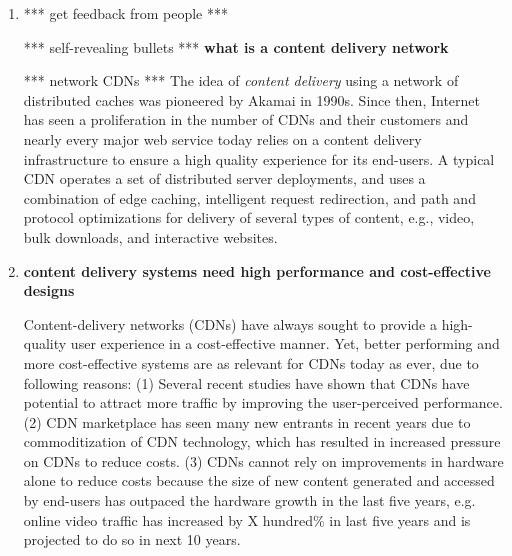 \begin{enumerate}
\item

*** get feedback from people ***

*** self-revealing bullets ***
\textbf{what is a content delivery network}


*** network CDNs ***
The idea of \emph{content delivery} using a network of distributed caches was pioneered by Akamai in 1990s. Since then, Internet has seen a proliferation in the number of CDNs and their customers and nearly every major web service today relies on a content delivery infrastructure to ensure a high quality experience for its end-users. A typical CDN  operates a set of distributed server deployments, and uses a combination of edge caching, intelligent request redirection, and path and protocol optimizations for delivery of several types of content, e.g., video, bulk downloads, and interactive websites. 


\item
\textbf{content delivery systems need  high performance and cost-effective designs}

Content-delivery networks (CDNs) have always sought to provide a high-quality user experience in a cost-effective manner. Yet, better performing and more cost-effective systems are as relevant for CDNs today as ever, due to following reasons:
(1) Several recent studies have shown that CDNs have potential to attract more traffic by improving the user-perceived performance.
(2) CDN marketplace has seen many new entrants in recent years due to commoditization of CDN technology, which has resulted in increased pressure on CDNs to reduce costs.
(3) CDNs cannot rely on improvements in hardware alone to reduce costs because the size of new content generated and accessed by end-users has outpaced the hardware growth in the last five years, e.g. online video traffic has increased by X hundred\% in last five years and is projected to do so in next 10 years.






\end{enumerate}
